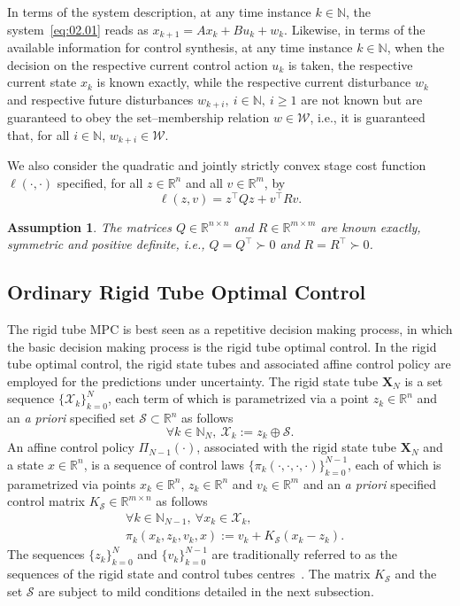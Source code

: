 \documentclass[twocolumn]{autart}
\newtheorem{assumption}{Assumption}
\newcommand{\mb}[1]{\mathbb{#1}}
\newcommand{\mc}[1]{\mathcal{#1}}
\newcommand{\mbf}[1]{\mathbf{#1}}
\newcommand{\bb}{\left(\cdot\right)}
\newcommand{\bbb}{\left(\cdot,\cdot\right)}
\newcommand{\bbbbb}{\left(\cdot,\cdot,\cdot,\cdot\right)}
\newcommand{\N}{\mb{N}}
\newcommand{\R}{\mb{R}}
\newcommand{\Rnm}[2]{\R^{{#1}\times{#2}}}
\numberwithin{equation}{section}
\begin{document}
In terms of the system description, at any time instance $k\in\N$, the system~\eqref{eq:02.01} reads as $x_{k+1}=Ax_k+Bu_k+w_k$. Likewise, in terms of  the available information for control synthesis, at any time instance $k\in\N$, when the decision on the respective current control action $u_k$ is taken, the respective current state $x_k$ is known exactly, while the respective current disturbance $w_k$ and respective future disturbances $w_{k+i},\ i\in\N,\ i\ge 1$ are not known but are guaranteed to obey the set--membership relation $w\in\mc{W}$, i.e., it is guaranteed that, for all $i\in\N$, $w_{k+i}\in\mc{W}$. 

We also consider the quadratic and jointly strictly convex stage cost function $\ell\bbb$ specified, for all $z\in \R^n$ and all $v\in \R^m$, by
\begin{equation}
\label{eq:02.04}
\ell(z,v)=z^\top Qz+v^\top Rv.
\end{equation}

\begin{assumption}
\label{ass:02.04}
The matrices $Q\in \Rnm{n}{n}$ and $R\in \Rnm{m}{m}$ are known exactly, symmetric and positive definite, i.e., $Q=Q^\top \succ 0$ and $R=R^\top \succ 0$.
\end{assumption}



\subsection{Ordinary Rigid Tube Optimal Control}
\label{sec:02.02}
The rigid tube MPC is best seen as a repetitive decision making process, in which the basic decision making process is the rigid tube optimal control. In the rigid tube optimal control, the rigid state tubes and associated affine control policy are employed for the predictions under uncertainty. The rigid state tube $\mbf{X}_N$ is a set sequence $\{\mc{X}_k\}_{k=0}^N$, each term of which is parametrized via a point $z_k\in\R^n$ and an \emph{a priori} specified set $\mc{S}\subset \R^n$ as follows
\begin{equation}
\label{eq:02.05}
\forall k\in\N_N,\ \mc{X}_k:=z_k\oplus \mc{S}.
\end{equation} 
An affine control policy $\Pi_{N-1}\bb$, associated with the rigid state tube $\mbf{X}_N$ and a state $x\in\R^n$, is  a sequence of control laws $\{\pi_k\bbbbb\}_{k=0}^{N-1}$, each of which is parametrized via points $x_k\in\R^n$, $z_k\in\R^n$ and $v_k\in\R^m$ and an \emph{a priori} specified control matrix $K_\mc{S}\in\Rnm{m}{n}$ as follows
\begin{align}
&\forall k\in\N_{N-1},\  \forall x_k\in \mc{X}_k,\nonumber\\
\label{eq:02.06}
&\pi_k(x_k,z_k,v_k,x):=v_k+K_\mc{S}(x_k-z_k).
\end{align} 
The sequences $\{z_k\}_{k=0}^N$ and $\{v_k\}_{k=0}^{N-1}$ are traditionally referred to as the sequences of the rigid state and control tubes centres~\cite{mayne:seron:rakovic:2005}.  The matrix $K_\mc{S}$ and the set $\mc{S}$ are subject to mild conditions detailed in the next subsection. 
\end{document}
